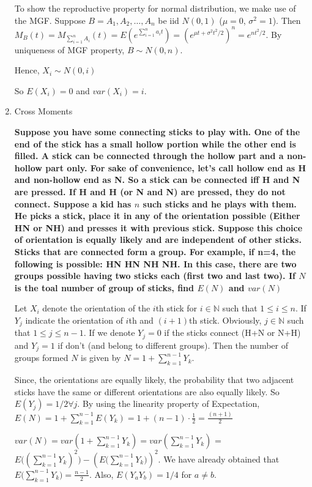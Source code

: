 \documentclass[12pt, oneside]{article}
\begin{document}
\begin{enumerate}
To show the reproductive property for normal distribution, we make use of the MGF. Suppose $B=A_1,A_2,\dots,A_n$ be iid $N(0,1)$ ($\mu = 0$, $\sigma^2=1$). Then $M_B(t) = M_{\sum_{i=1}^n A_i}(t) = E(e^{\sum_{i=1}^n a_i t}) = (e^{\mu t+ \sigma^2 t^2/2})^n = e^{nt^2/2}$. 
By uniqueness of MGF property, $B\sim N(0,n)$.

Hence, $X_i \sim N(0,i)$

So $E(X_i) = 0$ and $var(X_i) = i$.



\item Cross Moments


\noindent \textbf{Suppose you have some connecting sticks to play with. One of the end of the stick has a small hollow portion while the other end is filled. A stick can be connected through the hollow part and a non-hollow part only. For sake of convenience, let's call hollow end as H and non-hollow end as N. So a stick can be connected iff H and N are pressed. If H and H (or N and N) are pressed, they do not connect. Suppose a kid has $n$ such sticks and he plays with them. He picks a stick, place it in any of the orientation possible (Either HN or NH) and presses it with previous stick. Suppose this choice of orientation is equally likely and are independent of other sticks. Sticks that are connected form a group. For example, if n=4, the following is possible: HN HN NH NH. In this case, there are two groups possible having two sticks each (first two and last two). If $N$ is the toal number of group of sticks, find $E(N)$ and $var(N)$}

Let $X_i$ denote the orientation of the $i$th stick for $i \in \mathbb{N}$ such that $1 \le i \le n$. If $Y_j$ indicate the orientation of $i$th and $(i+1)$th stick. Obviously,  $j \in \mathbb{N}$ such that $1 \le j \le n-1$. If we denote $Y_j=0$ if the sticks connect (H+N or N+H) and $Y_j=1$ if don't (and belong to different groups). Then the number of groups formed $N$ is given by $N = 1 + \sum_{k=1}^{n-1} Y_k$.

Since, the orientations are equally likely, the probability that two adjacent sticks have the same or different orientations are also equally likely. So $E(Y_j) = 1/2 \forall j$. By using the linearity property of Expectation, $E(N) = 1 + \sum_{k=1}^{n-1} E(Y_k) = 1 + (n-1)\cdot \frac 1 2 = \frac{(n+1)}{2}$ 

$var(N) = var(1 + \sum_{k=1}^{n-1} Y_k) = var(\sum_{k=1}^{n-1} Y_k)$ = $E\big((\sum_{k=1}^{n-1} Y_k)^2\big)-(E\big(\sum_{k=1}^{n-1} Y_k\big))^2$. We have already obtained that $E\big(\sum_{k=1}^{n-1} Y_k\big) = \frac {n-1} {2}$. Also, $E(Y_aY_b) = 1/4$ for $a\ne b$. 


\end{enumerate}
\end{document}
